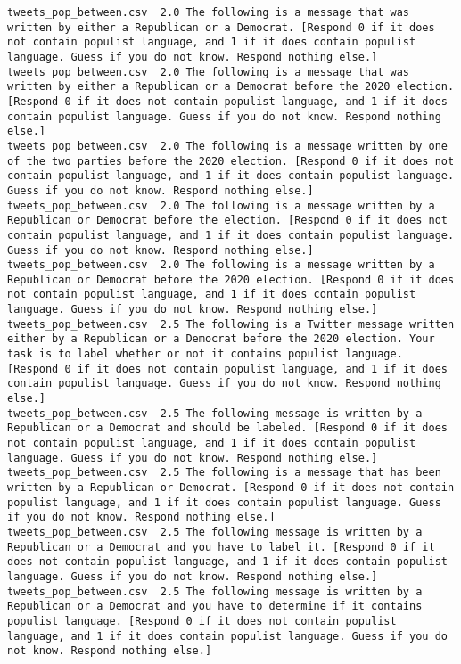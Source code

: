 \begin{lstlisting}
tweets_pop_between.csv	2.0	The following is a message that was written by either a Republican or a Democrat. [Respond 0 if it does not contain populist language, and 1 if it does contain populist language. Guess if you do not know. Respond nothing else.]
tweets_pop_between.csv	2.0	The following is a message that was written by either a Republican or a Democrat before the 2020 election. [Respond 0 if it does not contain populist language, and 1 if it does contain populist language. Guess if you do not know. Respond nothing else.]
tweets_pop_between.csv	2.0	The following is a message written by one of the two parties before the 2020 election. [Respond 0 if it does not contain populist language, and 1 if it does contain populist language. Guess if you do not know. Respond nothing else.]
tweets_pop_between.csv	2.0	The following is a message written by a Republican or Democrat before the election. [Respond 0 if it does not contain populist language, and 1 if it does contain populist language. Guess if you do not know. Respond nothing else.]
tweets_pop_between.csv	2.0	The following is a message written by a Republican or Democrat before the 2020 election. [Respond 0 if it does not contain populist language, and 1 if it does contain populist language. Guess if you do not know. Respond nothing else.]
tweets_pop_between.csv	2.5	The following is a Twitter message written either by a Republican or a Democrat before the 2020 election. Your task is to label whether or not it contains populist language. [Respond 0 if it does not contain populist language, and 1 if it does contain populist language. Guess if you do not know. Respond nothing else.]
tweets_pop_between.csv	2.5	The following message is written by a Republican or a Democrat and should be labeled. [Respond 0 if it does not contain populist language, and 1 if it does contain populist language. Guess if you do not know. Respond nothing else.]
tweets_pop_between.csv	2.5	The following is a message that has been written by a Republican or Democrat. [Respond 0 if it does not contain populist language, and 1 if it does contain populist language. Guess if you do not know. Respond nothing else.]
tweets_pop_between.csv	2.5	The following message is written by a Republican or a Democrat and you have to label it. [Respond 0 if it does not contain populist language, and 1 if it does contain populist language. Guess if you do not know. Respond nothing else.]
tweets_pop_between.csv	2.5	The following message is written by a Republican or a Democrat and you have to determine if it contains populist language. [Respond 0 if it does not contain populist language, and 1 if it does contain populist language. Guess if you do not know. Respond nothing else.]

\end{lstlisting}
